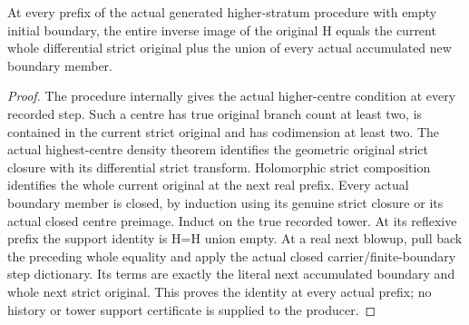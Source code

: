 \begin{lemma}
\label{hir:general-nc-generated-prefix-whole-total-support}
\leanok
At every prefix of the actual generated higher-stratum procedure with empty
initial boundary, the entire inverse image of the original H equals the
current whole differential strict original plus the union of every actual
accumulated new boundary member.
\end{lemma}
\begin{proof}
The procedure internally gives the actual higher-centre condition at every
recorded step. Such a centre has true original branch count at least two, is
contained in the current strict original and has codimension at least two.
The actual highest-centre density theorem identifies the geometric original
strict closure with its differential strict transform. Holomorphic strict
composition identifies the whole current original at the next real prefix.
Every actual boundary member is closed, by induction using its genuine strict
closure or its actual closed centre preimage. Induct on the true recorded
tower. At its reflexive prefix the support identity is H=H union empty. At a
real next blowup, pull back the preceding whole equality and apply the actual
closed carrier/finite-boundary step dictionary. Its terms are exactly the
literal next accumulated boundary and whole next strict original. This proves
the identity at every actual prefix; no history or tower support certificate
is supplied to the producer.
\end{proof}

